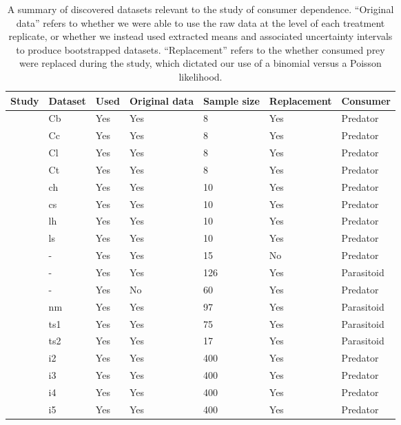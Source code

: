 \begin{table}[!tbp]
\caption{A summary of discovered datasets relevant to the study of consumer dependence.  ``Original data'' refers to whether we were able to use the raw data at the level of each treatment replicate, or whether we instead used extracted means and associated uncertainty intervals to produce bootstrapped datasets. ``Replacement'' refers to the whether consumed prey were replaced during the study, which dictated our use of a binomial versus a Poisson likelihood. \label{table:datasets}} 
\begin{center}
\begin{tabular}{lllllll}
\hline\hline
\multicolumn{1}{c}{Study}&\multicolumn{1}{c}{Dataset}&\multicolumn{1}{c}{Used}&\multicolumn{1}{c}{Original data}&\multicolumn{1}{c}{Sample size}&\multicolumn{1}{c}{Replacement}&\multicolumn{1}{c}{Consumer}\tabularnewline
\hline
\citet{Blowes:2017aa}&Cb&Yes&Yes&8&Yes&Predator\tabularnewline
\citet{Blowes:2017aa}&Cc&Yes&Yes&8&Yes&Predator\tabularnewline
\citet{Blowes:2017aa}&Cl&Yes&Yes&8&Yes&Predator\tabularnewline
\citet{Blowes:2017aa}&Ct&Yes&Yes&8&Yes&Predator\tabularnewline
\citet{Chan:2017aa}&ch&Yes&Yes&10&Yes&Predator\tabularnewline
\citet{Chan:2017aa}&cs&Yes&Yes&10&Yes&Predator\tabularnewline
\citet{Chan:2017aa}&lh&Yes&Yes&10&Yes&Predator\tabularnewline
\citet{Chan:2017aa}&ls&Yes&Yes&10&Yes&Predator\tabularnewline
\citet{Chant:1966aa}&-&Yes&Yes&15&No&Predator\tabularnewline
\citet{Chong:2006aa}&-&Yes&Yes&126&Yes&Parasitoid\tabularnewline
\citet{Crowley:1989aa}&-&Yes&No&60&Yes&Predator\tabularnewline
\citet{Edwards:1961aa}&nm&Yes&Yes&97&Yes&Parasitoid\tabularnewline
\citet{Edwards:1961aa}&ts1&Yes&Yes&75&Yes&Parasitoid\tabularnewline
\citet{Edwards:1961aa}&ts2&Yes&Yes&17&Yes&Parasitoid\tabularnewline
\citet{Elliott:2005aa}&i2&Yes&Yes&400&Yes&Predator\tabularnewline
\citet{Elliott:2005aa}&i3&Yes&Yes&400&Yes&Predator\tabularnewline
\citet{Elliott:2005aa}&i4&Yes&Yes&400&Yes&Predator\tabularnewline
\citet{Elliott:2005aa}&i5&Yes&Yes&400&Yes&Predator\tabularnewline

\end{tabular}
\end{center}
\end{table}
